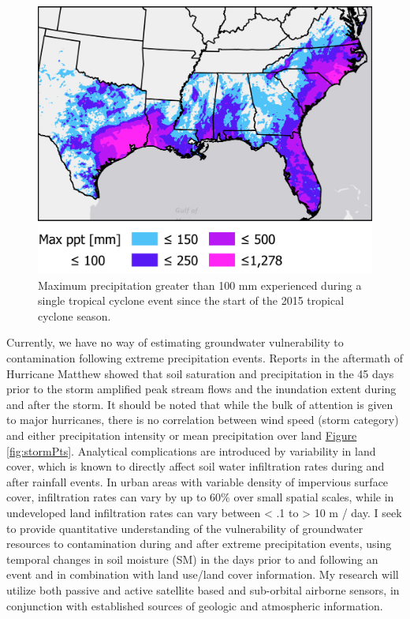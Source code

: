 \documentclass[
]{book}
\begin{document}
\begin{figure}
\includegraphics[width=47.51in]{img/max_ppt} \caption{Maximum precipitation greater than 100 mm experienced during a single tropical cyclone event since the start of the 2015 tropical cyclone season.}\label{fig:ppt}
\end{figure}

Currently, we have no way of estimating groundwater vulnerability to contamination following extreme precipitation events. Reports in the aftermath of Hurricane Matthew showed that soil saturation and precipitation in the 45 days prior to the storm amplified peak stream flows and the inundation extent during and after the storm\citep{musser2017}. It should be noted that while the bulk of attention is given to major hurricanes, there is no correlation between wind speed (storm category) and either precipitation intensity or mean precipitation over land \protect\hyperlink{fig:stormPts}{Figure \ref{fig:stormPts}}. Analytical complications are introduced by variability in land cover, which is known to directly affect soil water infiltration rates during and after rainfall events. In urban areas with variable density of impervious surface cover, infiltration rates can vary by up to 60\% over small spatial scales\citep{pauleit2000}, while in undeveloped land infiltration rates can vary between \textless{} .1 to \textgreater{} 10 m / day\citep{bouwer1999}. I seek to provide quantitative understanding of the vulnerability of groundwater resources to contamination during and after extreme precipitation events, using temporal changes in soil moisture (SM) in the days prior to and following an event and in combination with land use/land cover information. My research will utilize both passive and active satellite based and sub-orbital airborne sensors, in conjunction with established sources of geologic and atmospheric information.
\end{document}
